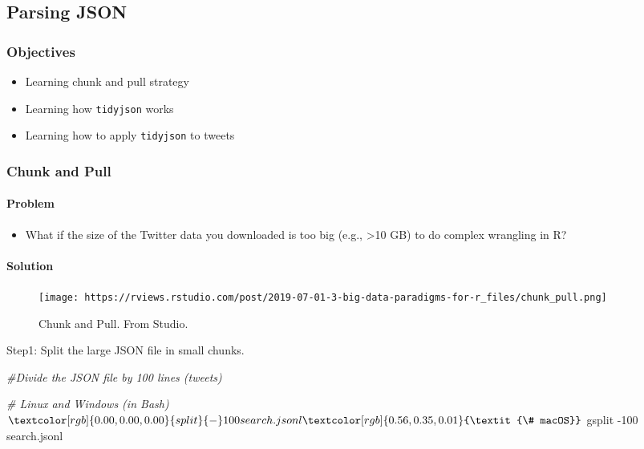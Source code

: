 \documentclass[
]{book}
\newenvironment{Shaded}{\begin{snugshade}}{\end{snugshade}}
\newcommand{\CommentTok}[1]{\textcolor[rgb]{0.56,0.35,0.01}{\textit{#1}}}
\newcommand{\ExtensionTok}[1]{#1}
\newcommand{\FunctionTok}[1]{\textcolor[rgb]{0.00,0.00,0.00}{#1}}
\newcommand{\NormalTok}[1]{#1}
\providecommand{\tightlist}{%
  \setlength{\itemsep}{0pt}\setlength{\parskip}{0pt}}
\begin{document}
\hypertarget{parsing-json}{%
\subsection{Parsing JSON}\label{parsing-json}}

\hypertarget{objectives-6}{%
\subsubsection{Objectives}\label{objectives-6}}

\begin{itemize}
\tightlist
\item
  Learning chunk and pull strategy
\item
  Learning how \texttt{tidyjson} works
\item
  Learning how to apply \texttt{tidyjson} to tweets
\end{itemize}

\hypertarget{chunk-and-pull}{%
\subsubsection{Chunk and Pull}\label{chunk-and-pull}}

\hypertarget{problem-3}{%
\paragraph{Problem}\label{problem-3}}

\begin{itemize}
\tightlist
\item
  What if the size of the Twitter data you downloaded is too big (e.g., \textgreater10 GB) to do complex wrangling in R?
\end{itemize}

\hypertarget{solution-2}{%
\paragraph{Solution}\label{solution-2}}

\begin{figure}
\centering
\texttt{[image: https://rviews.rstudio.com/post/2019-07-01-3-big-data-paradigms-for-r\_files/chunk\_pull.png]}
\caption{Chunk and Pull. From Studio.}
\end{figure}

Step1: Split the large JSON file in small chunks.

\begin{Shaded}
\begin{Highlighting}[]
\CommentTok{\#Divide the JSON file by 100 lines (tweets)}

\CommentTok{\# Linux and Windows (in Bash)}
\NormalTok{$ }\FunctionTok{split}\NormalTok{ {-}100 search.jsonl}

\CommentTok{\# macOS}
\NormalTok{$ }\ExtensionTok{gsplit}\NormalTok{ {-}100 search.jsonl}
\end{Highlighting}
\end{Shaded}
\end{document}
